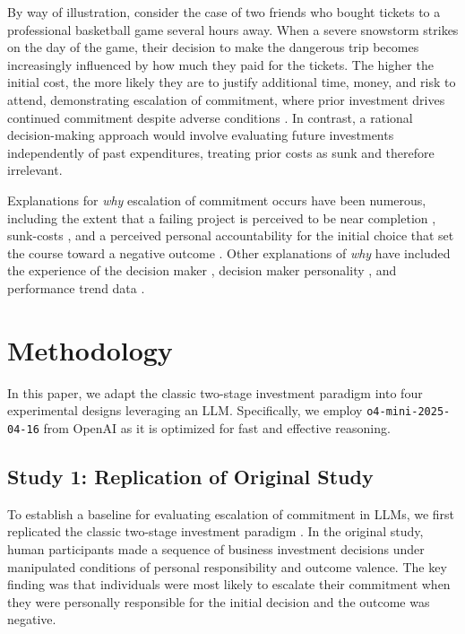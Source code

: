 \documentclass[letterpaper]{article} %
\begin{document}
By way of illustration, consider the case of two friends who bought tickets to a professional basketball game several hours away. When a severe snowstorm strikes on the day of the game, their decision to make the dangerous trip becomes increasingly influenced by how much they paid for the tickets. The higher the initial cost, the more likely they are to justify additional time, money, and risk to attend, demonstrating escalation of commitment, where prior investment drives continued commitment despite adverse conditions \cite{Thaler-2016}. In contrast, a rational decision-making approach would involve evaluating future investments independently of past expenditures, treating prior costs as sunk and therefore irrelevant.

Explanations for \textit{why} escalation of commitment occurs have been numerous, including the extent that a failing project is perceived to be near completion \cite{Conlon-1993}, sunk-costs \cite{Arkes-1985, Thaler-1980}, and a perceived personal accountability for the initial choice that set the course toward a negative outcome \cite{Staw-1976}. Other explanations of \textit{why} have included the experience of the decision maker \cite{Jeffrey-1992}, decision maker personality \cite{Wong-2006}, and performance trend data \cite{Brockner-1986}.

\section{Methodology}

In this paper, we adapt the classic two-stage investment paradigm \cite{Staw-1976} into four experimental designs leveraging an LLM. Specifically, we employ \texttt{o4-mini-2025-04-16} from OpenAI as it is optimized for fast and effective reasoning. %

\subsection{Study 1: Replication of Original Study}

To establish a baseline for evaluating escalation of commitment in LLMs, we first replicated the classic two-stage investment paradigm \cite{Staw-1976}. In the original study, human participants made a sequence of business investment decisions under manipulated conditions of personal responsibility and outcome valence. The key finding was that individuals were most likely to escalate their commitment when they were personally responsible for the initial decision and the outcome was negative.
\end{document}
